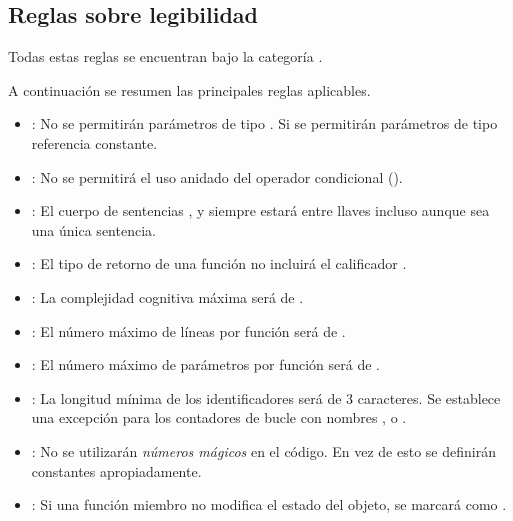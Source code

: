 \subsection{Reglas sobre legibilidad}

Todas estas reglas se encuentran bajo la categoría .

A continuación se resumen las principales reglas aplicables.

\begin{itemize}

\item {}:
No se permitirán parámetros de tipo .
Si se permitirán parámetros de tipo referencia constante.

\item {}:
No se permitirá el uso anidado del operador condicional ().

\item {}:
El cuerpo de sentencias ,  y 
siempre estará entre llaves incluso aunque sea una única sentencia.

\item {}:
El tipo de retorno de una función no incluirá el calificador .

\item {}:
La complejidad cognitiva máxima será de .

\item {}:
El número máximo de líneas por función será de .

\item {}:
El número máximo de parámetros por función será de .

\item {}:
La longitud mínima de los identificadores será de 3 caracteres.
Se establece una excepción para los contadores de bucle con nombres
,  o .

\item {}:
No se utilizarán \emph{números mágicos} en el código.
En vez de esto se definirán constantes apropiadamente.

\item {}:
Si una función miembro no modifica el estado del objeto, se marcará como .

\end{itemize}
